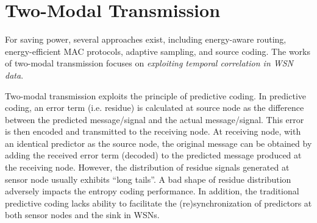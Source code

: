 \chapter{Two-Modal Transmission}

For saving power, several approaches exist, including \textcolor[rgb]{1,0,0}{energy-aware routing}, \textcolor[rgb]{1,0,0}{energy-efficient MAC protocols}, \textcolor[rgb]{1,0,0}{adaptive sampling}, and \textcolor[rgb]{1,0,0}{source coding}. The works of two-modal transmission focuses on \emph{\textcolor[rgb]{1,0,0}{exploiting temporal correlation in WSN data}}.

Two-modal transmission exploits the principle of predictive coding. In predictive coding, an error term (i.e. residue) is calculated at source node as the \textcolor[rgb]{1,0,0}{difference between the predicted message/signal and the actual message/signal}. This error is then encoded and transmitted to the receiving node. At receiving node, with an identical predictor as the source node, the original message can be obtained by adding the received error term (decoded) to the predicted message produced at the receiving node. However, the distribution of residue signals generated at sensor node usually \textcolor[rgb]{0,0,1}{exhibits ``long tails''}. A bad shape of residue distribution adversely \textcolor[rgb]{0,0,1}{impacts the entropy coding performance}. In addition, the traditional predictive coding lacks ability to facilitate the (re)synchronization of predictors at \textcolor[rgb]{0,0,1}{both sensor nodes and the sink} in WSNs.
